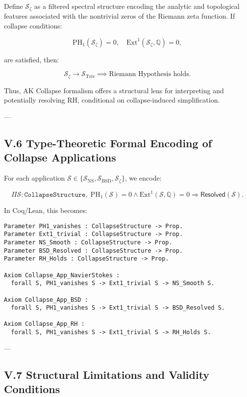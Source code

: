 \documentclass[11pt]{article}
\begin{document}
Define $\mathcal{S}_{\zeta}$ as a filtered spectral structure encoding the analytic and topological features associated with the nontrivial zeros of the Riemann zeta function.  
If collapse conditions:

\[
\mathrm{PH}_1(\mathcal{S}_{\zeta}) = 0, \quad \mathrm{Ext}^1(\mathcal{S}_{\zeta}, \mathbb{Q}) = 0,
\]

are satisfied, then:

\[
\mathcal{S}_{\zeta} \longrightarrow \mathcal{S}_{\mathrm{Triv}} \implies \text{Riemann Hypothesis holds}.
\]

Thus, AK Collapse formalism offers a structural lens for interpreting and potentially resolving RH, conditional on collapse-induced simplification.

---

\subsection*{V.6 Type-Theoretic Formal Encoding of Collapse Applications}

For each application $\mathcal{S} \in \{\mathcal{S}_{\mathrm{NS}}, \mathcal{S}_{\mathrm{BSD}}, \mathcal{S}_{\zeta}\}$, we encode:

\[
\Pi \mathcal{S} : \texttt{CollapseStructure},\;
\mathrm{PH}_1(\mathcal{S}) = 0 \wedge \mathrm{Ext}^1(\mathcal{S}, \mathbb{Q}) = 0
\Rightarrow
\mathsf{Resolved}(\mathcal{S}).
\]

In Coq/Lean, this becomes:

\begin{lstlisting}[language=Coq]
Parameter PH1_vanishes : CollapseStructure -> Prop.
Parameter Ext1_trivial : CollapseStructure -> Prop.
Parameter NS_Smooth : CollapseStructure -> Prop.
Parameter BSD_Resolved : CollapseStructure -> Prop.
Parameter RH_Holds : CollapseStructure -> Prop.

Axiom Collapse_App_NavierStokes :
  forall S, PH1_vanishes S -> Ext1_trivial S -> NS_Smooth S.

Axiom Collapse_App_BSD :
  forall S, PH1_vanishes S -> Ext1_trivial S -> BSD_Resolved S.

Axiom Collapse_App_RH :
  forall S, PH1_vanishes S -> Ext1_trivial S -> RH_Holds S.
\end{lstlisting}

---

\subsection*{V.7 Structural Limitations and Validity Conditions}
\end{document}
